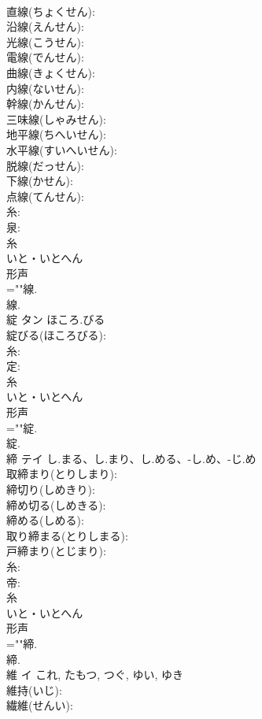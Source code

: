 \documentclass[8pt]{extreport}
\begin{document}
\begin{CJK}{UTF8}{min}
\\	直線(ちょくせん): 
\\	沿線(えんせん): 
\\	光線(こうせん): 
\\	電線(でんせん): 
\\	曲線(きょくせん): 
\\	内線(ないせん): 
\\	幹線(かんせん): 
\\	三味線(しゃみせん): 
\\	地平線(ちへいせん): 
\\	水平線(すいへいせん): 
\\	脱線(だっせん): 
\\	下線(かせん): 
\\	点線(てんせん): 
\\	糸: 
\\	泉: 
\\	糸	
\\	いと・いとへん	
\\	形声 
\\	=""線.
\\	線.
\\	綻	タン	ほころ.びる		
\\	綻びる(ほころびる): 
\\	糸: 
\\	定: 
\\	糸	
\\	いと・いとへん	
\\	形声 
\\	=""綻.
\\	綻.
\\	締	テイ	し.まる、し.まり、し.める、-し.め、-じ.め		
\\	取締まり(とりしまり): 
\\	締切り(しめきり): 
\\	締め切る(しめきる): 
\\	締める(しめる): 
\\	取り締まる(とりしまる): 
\\	戸締まり(とじまり): 
\\	糸: 
\\	帝: 
\\	糸	
\\	いと・いとへん	
\\	形声 
\\	=""締.
\\	締.
\\	維	イ		これ, たもつ, つぐ, ゆい, ゆき	
\\	維持(いじ): 
\\	繊維(せんい): 

\end{CJK}
\end{document}

